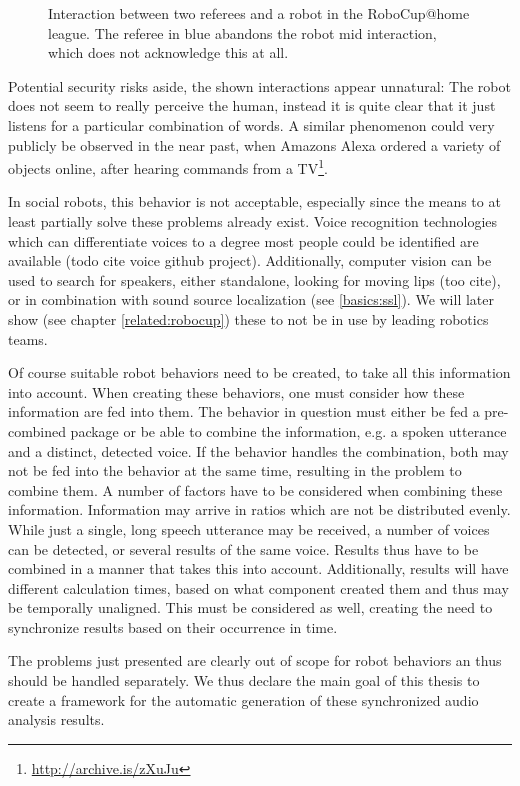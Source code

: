 \begin{figure}[]
	\caption{Interaction between two referees and a robot in the RoboCup@home league.
		The referee in blue abandons the robot mid interaction, which does not acknowledge this at all.}
	\label{pic:moti:imustgonow}
\end{figure}

Potential security risks aside, the shown interactions appear unnatural:
The robot does not seem to really perceive the human, instead it is quite clear that it just listens for a particular combination of words.
A similar phenomenon could very publicly be observed in the near past, when Amazons Alexa ordered a variety of objects online, after hearing commands from a  TV\footnote{\url{http://archive.is/zXuJu}}.

In social robots, this behavior is not acceptable, especially since the means to at least partially solve these problems already exist.
Voice recognition technologies which can differentiate voices to a degree most people could be identified are available (todo cite voice github project).
Additionally, computer vision can be used to search for speakers, either standalone, looking for moving lips (too cite), or in combination with sound source localization (see \ref{basics:ssl}).
We will later show (see chapter \ref{related:robocup}) these to not be in use by leading robotics teams.

Of course suitable robot behaviors need to be created, to take all this information into account.
When creating these behaviors, one must consider how these information are fed into them.
The behavior in question must either be fed a pre-combined package or be able to combine the information, e.g. a spoken utterance and a distinct, detected voice.
If the behavior handles the combination, both may not be fed into the behavior at the same time, resulting in the problem to combine them.
A number of factors have to be considered when combining these information.
Information may arrive in ratios which are not be distributed evenly.
While just a single, long speech utterance may be received, a number of voices can be detected, or several results of the same voice.
Results thus have to be combined in a manner that takes this into account.
Additionally, results will have different calculation times, based on what component created them and thus may be temporally unaligned.
This must be considered as well, creating the need to synchronize results based on their occurrence in time.

The problems just presented are clearly out of scope for robot behaviors an thus should be handled separately.
We thus declare the main goal of this thesis to create a framework for the automatic generation of these synchronized audio analysis results.

